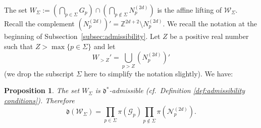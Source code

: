 \documentclass[12pt]{amsart}
\newtheorem{proposition}[theorem]{Proposition}
\newcommand{\cN}{\mathcal{N}}
\newcommand{\Z}{\mathbb{Z}}
\newcommand{\cW}{\mathcal{W}}
\newcommand{\cG}{\mathcal{G}}
\numberwithin{equation}{section}
\begin{document}
The set $W_{\Sigma}:=\left(\bigcap_{p\in\Sigma} G_p\right)\cap\left(\bigcap_{p\notin\Sigma} N_p^{(2d)}\right)$ is the affine lifting of $\cW_{\Sigma}$. 
Recall the complement $(N_p^{(2d)})'=\Z^{2d+2}\setminus N_p^{(2d)}$. 
We recall the notation at the beginning of Subsection~\ref{subsec:admissibility}. Let $Z$ be a positive real number such that
$Z>\max\{p\in\Sigma\}$ and let 
$$W_{>Z}'=\bigcup_{p>Z} (N_p^{(2d)})'$$
(we drop the subscript $\Sigma$ here to simplify the notation slightly). We have:
\begin{proposition}\label{delta admissible proposition}
    The set $W_{\Sigma}$ is $\mathfrak{d}^*$-admissible (cf.~Definition \ref{def:admissibility conditions}). Therefore 
    $$\mathfrak{d}(\cW_\Sigma)=\prod_{p\in\Sigma}\pi(\cG_p)\prod_{p\notin\Sigma}\pi(\cN_p^{(2d)}).$$
\end{proposition}
\end{document}
